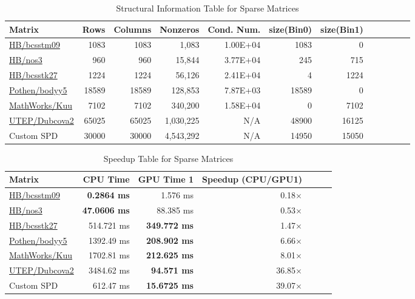 \documentclass[conference]{IEEEtran}
\begin{document}
\begin{table}[htbp]
\centering
\tiny
\caption{Structural Information Table for Sparse Matrices}
\begin{tabular}{lrrrrrrrrrrr}
\hline
Matrix & Rows & Columns & Nonzeros & Cond. Num. & size(Bin0) & size(Bin1) \\
\hline
\href{https://sparse.tamu.edu/HB/bcsstm09}{HB/bcsstm09}    & 1083   & 1083   & 1,083     & 1.00E+04   & 1083   & 0     \\
\href{https://sparse.tamu.edu/HB/nos3}{HB/nos3}        & 960    & 960    & 15,844    & 3.77E+04   & 245    & 715    \\
\href{https://sparse.tamu.edu/HB/bcsstk27}{HB/bcsstk27}    & 1224   & 1224   & 56,126    & 2.41E+04   & 4      & 1224    \\
\href{https://sparse.tamu.edu/Pothen/bodyy5}{Pothen/bodyy5}  & 18589  & 18589  & 128,853   & 7.87E+03   & 18589  & 0       \\
\href{https://sparse.tamu.edu/MathWorks/Kuu}{MathWorks/Kuu}  & 7102   & 7102   & 340,200   & 1.58E+04   & 0      & 7102    \\
\href{https://sparse.tamu.edu/UTEP/Dubcova2}{UTEP/Dubcova2}  & 65025  & 65025  & 1,030,225 & N/A        & 48900  & 16125  \\
Custom SPD  & 30000  & 30000  & 4,543,292 & N/A        & 14950  & 15050  \\
\hline
\end{tabular}
\label{tableDataset}
\end{table}

\begin{table}[htbp]
\centering
\tiny
\caption{Speedup Table for Sparse Matrices}
\begin{tabular}{lrrrrrr}
\hline
Matrix & CPU Time & GPU Time 1 & Speedup (CPU/GPU1) \\
\hline
\href{https://sparse.tamu.edu/HB/bcsstm09}{HB/bcsstm09}     & \textbf{0.2864 ms}   & 1.576 ms  & 0.18$\times$ \\
\href{https://sparse.tamu.edu/HB/nos3}{HB/nos3}        		  & \textbf{47.0606 ms}  & 88.385 ms  & 0.53$\times$ \\
\href{https://sparse.tamu.edu/HB/bcsstk27}{HB/bcsstk27}      & 514.721 ms           & \textbf{349.772 ms} & 1.47$\times$ \\
\href{https://sparse.tamu.edu/Pothen/bodyy5}{Pothen/bodyy5}  & 1392.49 ms           & \textbf{208.902 ms} & 6.66$\times$ \\
\href{https://sparse.tamu.edu/MathWorks/Kuu}{MathWorks/Kuu}  & 1702.81 ms           & \textbf{212.625 ms} & 8.01$\times$ \\
\href{https://sparse.tamu.edu/UTEP/Dubcova2}{UTEP/Dubcova2}  & 3484.62 ms           & \textbf{94.571 ms}  & 36.85$\times$ \\
Custom SPD     															& 612.47 ms            & \textbf{15.6725 ms} & 39.07$\times$ \\
\hline
\end{tabular}
\label{tableSpeed}
\end{table}
\end{document}
